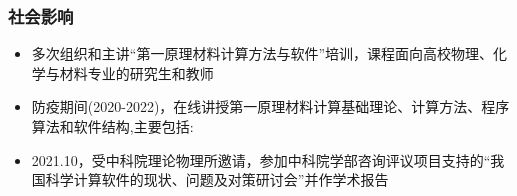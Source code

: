\frame
{
	\frametitle{社会影响}
	\begin{itemize}
		\setlength{\itemsep}{15pt}
		\item 多次组织和主讲“第一原理材料计算方法与软件”培训，课程面向高校物理、化学与材料专业的研究生和教师
		\item 防疫期间\textrm{(2020-2022)}，在线讲授第一原理材料计算基础理论、计算方法、程序算法和软件结构,主要包括:\vskip 5pt
			{\fontsize{8.5pt}{4.2pt}\selectfont{密度泛函基本理论、固体能带理论}}\vskip 5pt
			{\fontsize{8.5pt}{4.2pt}}\vskip 5pt
			{\fontsize{8.5pt}{4.2pt}}\vskip 5pt
			{\fontsize{8.5pt}{4.2pt}}
		\item \textrm{2021.10}，受中科院理论物理所邀请，参加中科院学部咨询评议项目支持的“我国科学计算软件的现状、问题及对策研讨会”并作学术报告
	\end{itemize}
}

